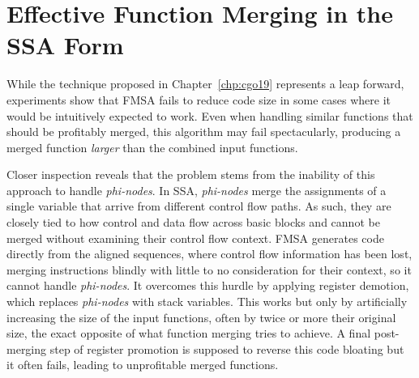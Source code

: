 
\chapter{Effective Function Merging in the SSA Form} \label{chp:pldi20}



While the technique proposed in Chapter~\ref{chp:cgo19} represents a leap forward, experiments show that FMSA fails to reduce code size in some cases where it would be intuitively expected to work.
Even when handling similar functions that should be profitably merged, this algorithm may fail spectacularly, producing a merged function \textit{larger} than the combined input functions.

Closer inspection reveals that the problem stems from the inability of this
approach to handle \textit{phi-nodes}. In SSA, \textit{phi-nodes} merge the
assignments of a single variable that arrive from different control flow paths.
As such, they are closely tied to how control and data flow across basic blocks
and cannot be merged without examining their control flow context.
FMSA generates code directly from the aligned sequences, where
control flow information has been lost, merging instructions blindly with little
to no consideration for their context, so it cannot handle \textit{phi-nodes}.
It overcomes this hurdle by applying register demotion, which replaces
\textit{phi-nodes} with stack variables.
This works but only by artificially increasing the size of the input functions,
often by twice or more their original size, the exact opposite of what function merging
tries to achieve.
A final post-merging step of register promotion is supposed to reverse this code
bloating but it often fails, leading to unprofitable merged functions.

